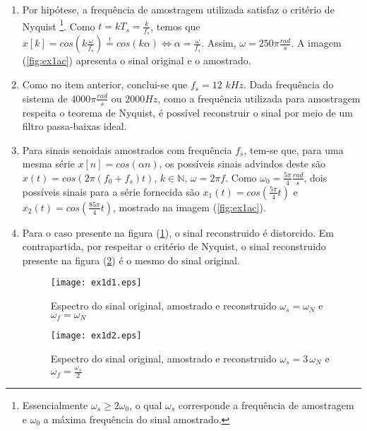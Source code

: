     \begin{enumerate}

        \item %
        
        Por hipótese, a frequência de amostragem utilizada satisfaz o critério de Nyquist \footnote{Essencialmente $\omega_s \geq 2\omega_0$, o qual $\omega_s$ corresponde a frequência de amostragem e $\omega_0$ a máxima frequência do sinal amostrado.}. Como $t = kT_s = \frac{k}{f_s}$, temos que $x[k] = cos(k \frac{\omega}{f_s})  \stackrel{!}{=} cos(k \alpha) \Longleftrightarrow \alpha = \frac{\omega}{f_s}$. Assim, $\omega = 250\pi \frac{rad}{s}$. A imagem (\ref{fig:ex1ac}) apresenta o sinal original e o amostrado.
        
        \item %
        
        Como no item anterior, conclui-se que $f_s = 12$ $kHz$. Dada frequência do sistema de $4000\pi \frac{rad}{s}$ ou $2000 Hz$, como a frequência utilizada para amostragem respeita o teorema de Nyquist, é possível reconstruir o sinal por meio de um filtro passa-baixas ideal. 
        
        \item %
        Para sinais senoidais amostrados com frequência $f_s$, tem-se que, para uma mesma série $x[n] = cos(\alpha n)$, os possíveis sinais advindos deste são $x(t) = cos(2 \pi (f_0 + f_s)t) \mbox{, } k \in \mathbb{N} \mbox{, } \omega = 2 \pi f$. Como $\omega_0 = \frac{5\pi}{4} \frac{rad}{s}$, dois possíveis sinais para a série fornecida são $x_1(t) = cos(\frac{5\pi}{4} t )$ e $x_2(t) = cos(\frac{85\pi}{4} t)$, mostrado na imagem (\ref{fig:ex1ac}). 
        
        \item %
        
        Para o caso presente na figura (\ref{fig:ex1d1}), o sinal reconstruido é distorcido. Em contrapartida, por respeitar o critério de Nyquist, o sinal reconstruido presente na figura (\ref{fig:ex1d2}) é o mesmo do sinal original.
        
        \newpage

        \begin{figure}[H]
            \centering
            \texttt{[image: ex1d1.eps]}
            \caption{Espectro do sinal original, amostrado e reconstruido $\omega_s = \omega_N$ e $\omega_f = \omega_N$}
            \label{fig:ex1d1}
        \end{figure}%
    
        \begin{figure}[H]
            \centering
            \texttt{[image: ex1d2.eps]}
            \caption{Espectro do sinal original, amostrado e reconstruido $\omega_s = 3 \, \omega_N$ e $\omega_f = \frac{\omega_s}{2}$}
            \label{fig:ex1d2}
        \end{figure}
    
    \end{enumerate}